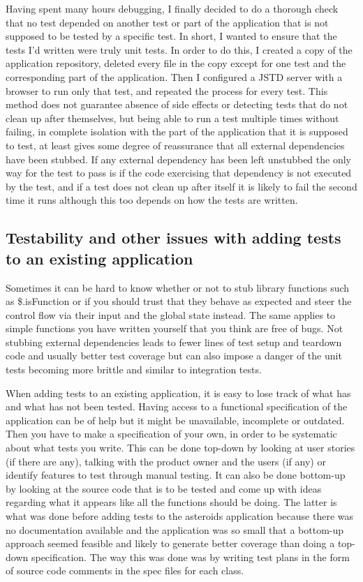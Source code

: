 \documentclass[11pt]{article}
\begin{document}
Having spent many hours debugging, I finally decided to do a thorough check that no test depended on another test or part of the application that is not supposed to be tested by a specific test. In short, I wanted to ensure that the tests I'd written were truly unit tests. In order to do this, I created a copy of the application repository, deleted every file in the copy except for one test and the corresponding part of the application. Then I configured a JSTD server with a browser to run only that test, and repeated the process for every test. This method does not guarantee absence of side effects or detecting tests that do not clean up after themselves, but being able to run a test multiple times without failing, in complete isolation with the part of the application that it is supposed to test, at least gives some degree of reassurance that all external dependencies have been stubbed. If any external dependency has been left unstubbed the only way for the test to pass is if the code exercising that dependency is not executed by the test, and if a test does not clean up after itself it is likely to fail the second time it runs although this too depends on how the tests are written.

\subsection{Testability and other issues with adding tests to an existing application}

Sometimes it can be hard to know whether or not to stub library functions such as \$.isFunction or if you should trust that they behave as expected and steer the control flow via their input and the global state instead. The same applies to simple functions you have written yourself that you think are free of bugs. Not stubbing external dependencies leads to fewer lines of test setup and teardown code and usually better test coverage but can also impose a danger of the unit tests becoming more brittle and similar to integration tests.

When adding tests to an existing application, it is easy to lose track of what has and what has not been tested. Having access to a functional specification of the application can be of help but it might be unavailable, incomplete or outdated. Then you have to make a specification of your own, in order to be systematic about what tests you write. This can be done top-down by looking at user stories (if there are any), talking with the product owner and the users (if any) or identify features to test through manual testing. It can also be done bottom-up by looking at the source code that is to be tested and come up with ideas regarding what it appears like all the functions should be doing. The latter is what was done before adding tests to the asteroids application because there was no documentation available and the application was so small that a bottom-up approach seemed feasible and likely to generate better coverage than doing a top-down specification. The way this was done was by writing test plans in the form of source code comments in the spec files for each class.
\end{document}
